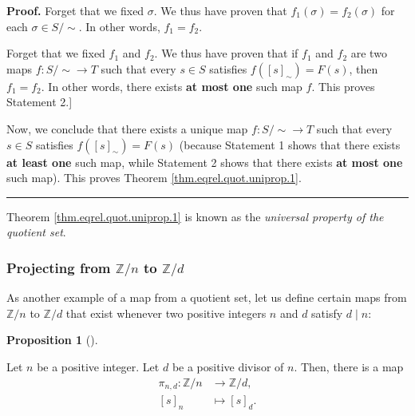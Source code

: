 \documentclass[numbers=enddot,12pt,final,onecolumn,notitlepage]{scrartcl}%
\numberwithin{exer}{subsection}
\theoremstyle{definition}
\newtheorem{prop}[theo]{Proposition}
\newenvironment{proposition}[1][]
{\begin{prop}[#1]\begin{leftbar}}
{\end{leftbar}\end{prop}}
\newenvironment{fineprint}{\begin{small}}{\end{small}}
\newenvironment{proof}[1][Proof]{\noindent\textbf{#1.} }{\ \rule{0.5em}{0.5em}}
\begin{document}
\begin{fineprint}
\begin{proof}
Forget that we fixed $\sigma$. We thus have proven that $f_{1}\left(
\sigma\right)  =f_{2}\left(  \sigma\right)  $ for each $\sigma\in\left.
S/\sim\right.  $. In other words, $f_{1}=f_{2}$.

Forget that we fixed $f_{1}$ and $f_{2}$. We thus have proven that if $f_{1}$
and $f_{2}$ are two maps $f:\left.  S/\sim\right.  \rightarrow T$ such that
every $s\in S$ satisfies $f\left(  \left[  s\right]  _{\sim}\right)  =F\left(
s\right)  $, then $f_{1}=f_{2}$. In other words, there exists \textbf{at most
one} such map $f$. This proves Statement 2.]

Now, we conclude that there exists a unique map $f:\left.  S/\sim\right.
\rightarrow T$ such that every $s\in S$ satisfies $f\left(  \left[  s\right]
_{\sim}\right)  =F\left(  s\right)  $ (because Statement 1 shows that there
exists \textbf{at least one} such map, while Statement 2 shows that there
exists \textbf{at most one} such map). This proves Theorem
\ref{thm.eqrel.quot.uniprop.1}.
\end{proof}
\end{fineprint}

Theorem \ref{thm.eqrel.quot.uniprop.1} is known as the \textit{universal
property of the quotient set}.

\subsubsection{Projecting from $\mathbb{Z}/n$ to $\mathbb{Z}/d$}

As another example of a map from a quotient set, let us define certain maps
from $\mathbb{Z}/n$ to $\mathbb{Z}/d$ that exist whenever two positive
integers $n$ and $d$ satisfy $d\mid n$:

\begin{proposition}
\label{prop.eqrel.Z/n.pind.wd}Let $n$ be a positive integer. Let $d$ be a
positive divisor of $n$. Then, there is a map%
\begin{align*}
\pi_{n,d}:\mathbb{Z}/n  &  \rightarrow\mathbb{Z}/d,\\
\left[  s\right]  _{n}  &  \mapsto\left[  s\right]  _{d}.
\end{align*}

\end{proposition}
\end{document}
